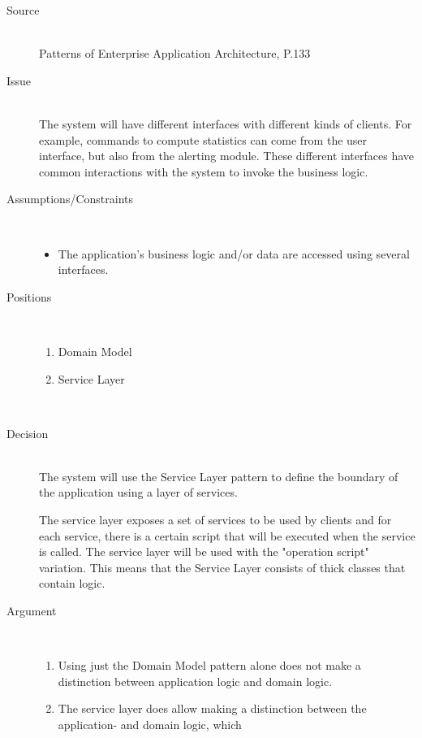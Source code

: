 \begin{description}
\item [Source]~\\
Patterns of Enterprise Application Architecture, P.133 \cite{Fowler:2002:PEA:579257}

\item [Issue]~\\
The system will have different interfaces with different kinds of clients. For example, commands to compute statistics can come from the user interface, but also from the alerting module. These different interfaces have common interactions with the system to invoke the business logic.

\item [Assumptions/Constraints]~
\begin{itemize}
\item The application's business logic and/or data are accessed using several interfaces.
\end{itemize}

\item [Positions]~
\begin{enumerate}
\item Domain Model %
\item Service Layer
\end{enumerate}
~\\[-1.5cm]

\item [Decision] ~\\
The system will use the Service Layer pattern to define the boundary of the application using a layer of services.

The service layer exposes a set of services to be used by clients and for each service, there is a certain script that will be executed when the service is called. The service layer will be used with the "operation script" variation. This means that the Service Layer consists of thick classes that contain logic.
\item [Argument]~
\begin{enumerate}
\item Using just the Domain Model pattern alone does not make a distinction between application logic and domain logic.

\item The service layer does allow making a distinction between the application- and domain logic, which 
\end{enumerate}


\end{description}
